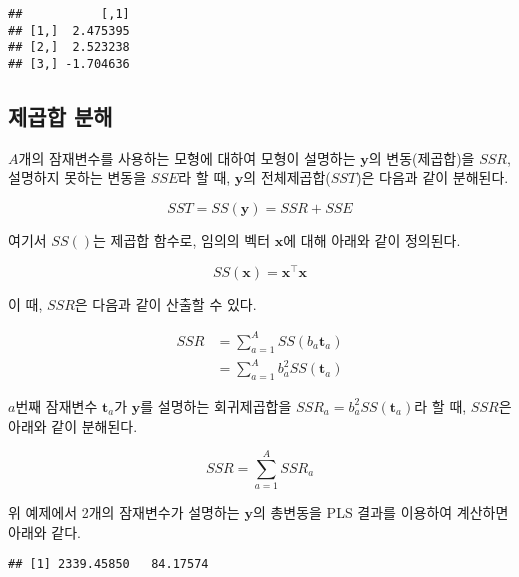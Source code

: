 \documentclass[]{book}
\newenvironment{Shaded}{\begin{snugshade}}{\end{snugshade}}
\newcommand{\DecValTok}[1]{\textcolor[rgb]{0.00,0.00,0.81}{#1}}
\newcommand{\KeywordTok}[1]{\textcolor[rgb]{0.13,0.29,0.53}{\textbf{#1}}}
\newcommand{\NormalTok}[1]{#1}
\newcommand{\OperatorTok}[1]{\textcolor[rgb]{0.81,0.36,0.00}{\textbf{#1}}}
\newcommand{\StringTok}[1]{\textcolor[rgb]{0.31,0.60,0.02}{#1}}
\begin{document}
\begin{verbatim}
##           [,1]
## [1,]  2.475395
## [2,]  2.523238
## [3,] -1.704636
\end{verbatim}

\hypertarget{plsr-sst}{%
\subsection{제곱합 분해}\label{plsr-sst}}

\(A\)개의 잠재변수를 사용하는 모형에 대하여 모형이 설명하는 \(\mathbf{y}\)의 변동(제곱합)을 \({SSR}\), 설명하지 못하는 변동을 \({SSE}\)라 할 때, \(\mathbf{y}\)의 전체제곱합(\({SST}\))은 다음과 같이 분해된다.

\[{SST} = {SS}(\mathbf{y}) = {SSR} + {SSE}\]

여기서 \({SS}()\)는 제곱합 함수로, 임의의 벡터 \(\mathbf{x}\)에 대해 아래와 같이 정의된다.

\[
{SS}(\mathbf{x}) = \mathbf{x}^\top \mathbf{x}
\]

이 때, \({SSR}\)은 다음과 같이 산출할 수 있다.

\begin{equation}
\begin{split}
SSR &= \sum_{a = 1}^{A} SS(b_a \mathbf{t}_a)\\
&= \sum_{a = 1}^{A} b_a^2 SS(\mathbf{t}_a)
\end{split} \label{eq:plsr-ssr}
\end{equation}

\(a\)번째 잠재변수 \(\mathbf{t}_a\)가 \(\mathbf{y}\)를 설명하는 회귀제곱합을 \(SSR_a = b_a^2 SS(\mathbf{t}_a)\)라 할 때, \(SSR\)은 아래와 같이 분해된다.

\[
SSR = \sum_{a = 1}^{A} SSR_a
\]

위 예제에서 2개의 잠재변수가 설명하는 \(\mathbf{y}\)의 총변동을 PLS 결과를 이용하여 계산하면 아래와 같다.

\begin{Shaded}
\end{Shaded}

\begin{verbatim}
## [1] 2339.45850   84.17574
\end{verbatim}
\end{document}

